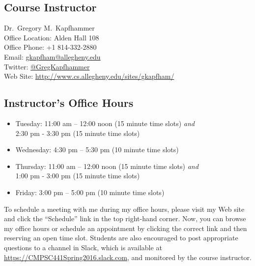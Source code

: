 


\usepackage[compact]{titlesec}



\subsection*{Course Instructor}
Dr.\ Gregory M.\ Kapfhammer\\
\noindent Office Location: Alden Hall 108 \\
\noindent Office Phone: +1 814-332-2880 \\
\noindent Email: \url{gkapfham@allegheny.edu} \\
\noindent Twitter: \url{@GregKapfhammer} \\
\noindent Web Site: \url{http://www.cs.allegheny.edu/sites/gkapfham/}

\subsection*{Instructor's Office Hours}

\begin{itemize}
  \itemsep 0em

  \item Tuesday: 11:00 am -- 12:00 noon (15 minute time slots) {\em and} \\ \hspace*{.6in}
    2:30 pm - 3:30 pm (15 minute time slots)

  \item Wednesday: 4:30 pm -- 5:30 pm (10 minute time slots)

  \item Thursday: 11:00 am -- 12:00 noon (15 minute time slots) {\em and} \\ \hspace*{.68in}
    1:00 pm - 3:00 pm (15 minute time slots)

  \item Friday: 3:00 pm -- 5:00 pm (10 minute time slots)

\end{itemize}

\noindent To schedule a meeting with me during my office hours, please visit my Web site and click the ``Schedule'' link
in the top right-hand corner. Now, you can browse my office hours or schedule an appointment by clicking the correct
link and then reserving an open time slot. Students are also encouraged to post appropriate questions to a channel in
Slack, which is available at \url{https://CMPSC441Spring2016.slack.com}, and monitored by the course instructor.

